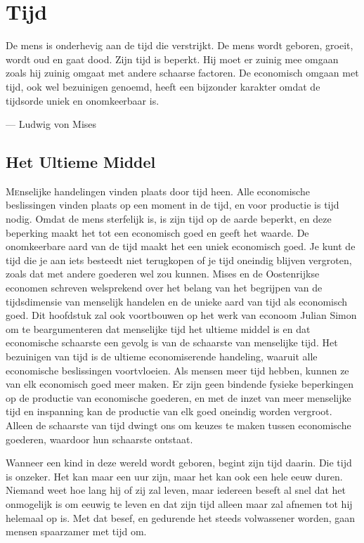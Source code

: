 \chapter{Tijd}

\begin{blockquotebox}
    De mens is onderhevig aan de tijd die verstrijkt. De mens wordt geboren, groeit, wordt oud en gaat dood. Zijn tijd is beperkt. Hij moet er zuinig mee omgaan zoals hij zuinig omgaat met andere schaarse factoren. De economisch omgaan met tijd, ook wel bezuinigen genoemd, heeft een bijzonder karakter omdat de tijdsorde uniek en onomkeerbaar is.\footnotemark
    \par\raggedleft--- Ludwig von Mises
\end{blockquotebox}

\section{Het Ultieme Middel}

\lettrine{M}enselijke handelingen vinden plaats door tijd heen. Alle economische
beslissingen vinden plaats op een moment in de tijd, en voor productie
is tijd nodig. Omdat de mens sterfelijk is, is zijn tijd op de aarde
beperkt, en deze beperking maakt het tot een economisch goed en geeft
het waarde. De onomkeerbare aard van de tijd maakt het een uniek
economisch goed. Je kunt de tijd die je aan iets besteedt niet
terugkopen of je tijd oneindig blijven vergroten, zoals dat met andere
goederen wel zou kunnen. Mises en de Oostenrijkse economen schreven
welsprekend over het belang van het begrijpen van de tijdsdimensie van
menselijk handelen en de unieke aard van tijd als economisch goed. Dit
hoofdstuk zal ook voortbouwen op het werk van econoom Julian Simon om te
beargumenteren dat menselijke tijd het ultieme middel is en dat
economische schaarste een gevolg is van de schaarste van menselijke
tijd. Het bezuinigen van tijd is de ultieme economiserende handeling,
waaruit alle economische beslissingen voortvloeien. Als mensen meer tijd
hebben, kunnen ze van elk economisch goed meer maken.\autocite{25} Er zijn
geen bindende fysieke beperkingen op de productie van economische
goederen, en met de inzet van meer menselijke tijd en inspanning kan de
productie van elk goed oneindig worden vergroot. Alleen de schaarste van
tijd dwingt ons om keuzes te maken tussen economische goederen, waardoor
hun schaarste ontstaat.

Wanneer een kind in deze wereld wordt geboren, begint zijn tijd daarin.
Die tijd is onzeker. Het kan maar een uur zijn, maar het kan ook een
hele eeuw duren. Niemand weet hoe lang hij of zij zal leven, maar
iedereen beseft al snel dat het onmogelijk is om eeuwig te leven en dat
zijn tijd alleen maar zal afnemen tot hij helemaal op is. Met dat besef,
en gedurende het steeds volwassener worden, gaan mensen spaarzamer met
tijd om.

